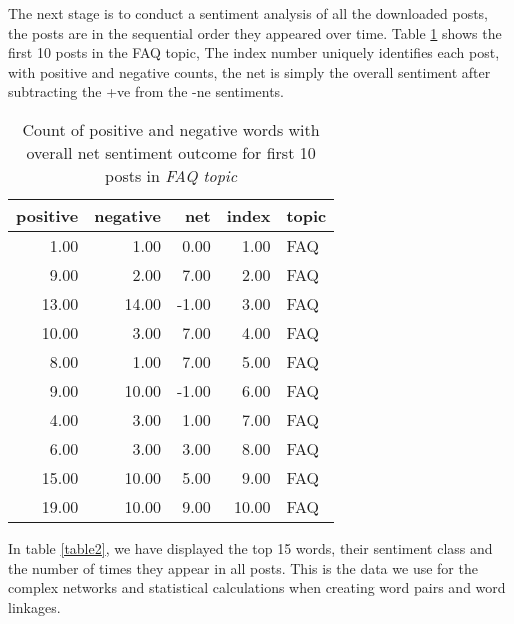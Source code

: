 \documentclass{ewic}
\begin{document}
The next stage is to conduct a sentiment analysis of all the downloaded posts, the posts are in the sequential order they appeared over time.  Table \ref{table1} shows the first 10 posts in the FAQ topic, The index number uniquely identifies each post, with positive and negative  counts, the net is simply the overall sentiment after subtracting the +ve from the -ne sentiments.

\begin{table}[h]
\centering \scriptsize
\begin{tabular}{rrrrl}
  \hline
positive & negative & net & index & topic \\ 
  \hline
1.00 & 1.00 & 0.00 & 1.00 & FAQ \\ 
 9.00 & 2.00 & 7.00 & 2.00 & FAQ \\ 
  13.00 & 14.00 & -1.00 & 3.00 & FAQ \\ 
 10.00 & 3.00 & 7.00 & 4.00 & FAQ \\ 
 8.00 & 1.00 & 7.00 & 5.00 & FAQ \\ 
9.00 & 10.00 & -1.00 & 6.00 & FAQ \\ 
 4.00 & 3.00 & 1.00 & 7.00 & FAQ \\ 
 6.00 & 3.00 & 3.00 & 8.00 & FAQ \\ 
 15.00 & 10.00 & 5.00 & 9.00 & FAQ \\ 
19.00 & 10.00 & 9.00 & 10.00 & FAQ \\ 
   \hline
\end{tabular} \normalsize
 \caption{Count of positive and negative words with overall net sentiment outcome for first 10 posts in {\it FAQ topic}}
 \label{table1}
\end{table}

In table \ref{table2}, we have displayed the top 15 words, their sentiment class and the number of times they appear in all posts. This is the data we use for the complex networks and statistical calculations when creating word pairs and word linkages.
\end{document}
